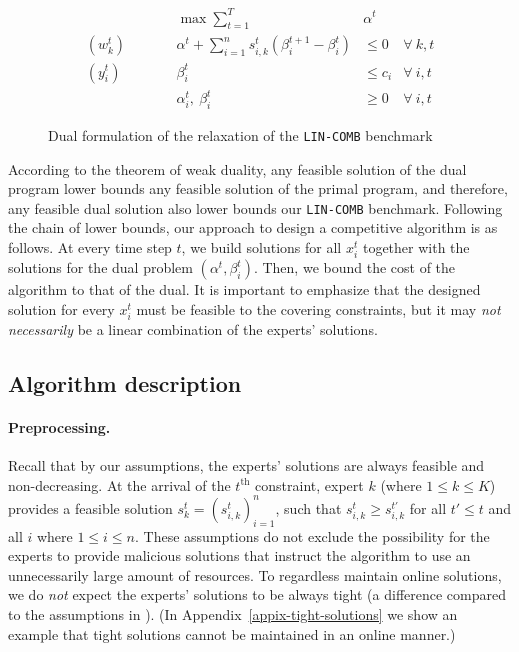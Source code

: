 \begin{figure}[ht]
	\begin{mdframed}
		\begin{align*}
			&& \max \sum_{t=1}^{T} & \alpha^{t} \\
			(w_{k}^{t}) \qquad && \alpha^{t} + \sum_{i=1}^{n} s_{i,k}^{t} ( \beta_{i}^{t+1} - \beta_{i}^{t})   &\leq 0  &\forall\ k,t\\
			(y_{i}^{t}) \qquad && \beta_{i}^{t}   &\leq c_{i}  &\forall\ i,t \\
			&& \alpha_{i}^{t},\ \beta_{i}^{t} & \ge 0 & \forall\ i,t
		\end{align*}
	\end{mdframed}
	\caption{Dual formulation of the relaxation of the \texttt{LIN-COMB} benchmark}
	\label{fig:dual}
\end{figure}


According to the theorem of weak duality, any feasible solution of the dual program lower bounds any feasible solution of the primal program, and therefore, any feasible dual solution also lower bounds our \texttt{LIN-COMB} benchmark. Following the chain of lower bounds, our approach to design a competitive algorithm is as follows. At every time step $t$, we build solutions for all $x_{i}^{t}$ together with the solutions for the dual problem $(\alpha^{t}, \beta_{i}^{t})$. Then, we bound the cost of the algorithm to that of the dual. It is important to emphasize that the designed solution for every $x_{i}^{t}$ must be feasible to the covering constraints, but it may \emph{not necessarily} be a linear combination of the experts' solutions.

\subsection{Algorithm description} \label{sec:algo}

\paragraph{Preprocessing.}
Recall that by our assumptions, the experts' solutions are always feasible and non-decreasing. At the arrival of the $t^{\text{th}}$ constraint, expert $k$ (where $1 \leq k \leq K$) provides a feasible solution $s_{k}^{t} = (s_{i,k}^{t})_{i=1}^{n}$, such that $s_{i,k}^{t} \ge s_{i,k}^{t'}$ for all $t' \le t$ and all $i$ where $1 \le i \le n$. These assumptions do not exclude the possibility for the experts to provide malicious solutions that instruct the algorithm to use an unnecessarily large amount of resources.
To regardless maintain online solutions, we do \emph{not} expect the experts' solutions to be always tight (a difference compared to the assumptions in \cite{AnandGe22:Online-Algorithms}).
(In Appendix~\ref{appix-tight-solutions}
we show an example that tight solutions cannot be maintained in an online manner.)



